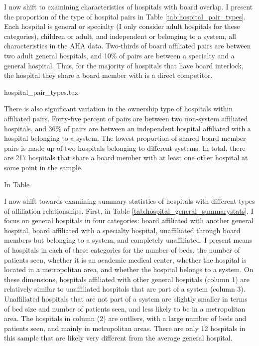 \documentclass[12pt]{article}
\begin{document}
    I now shift to examining characteristics of hospitals with board overlap. I present the proportion of the type of hospital pairs in Table \ref{tab:hospital_pair_types}. Each hospital is general or specialty (I only consider adult hospitals for these categories), children or adult, and independent or belonging to a system, all characteristics in the AHA data. Two-thirds of board affiliated pairs are between two adult general hospitals, and 10\% of pairs are between a specialty and a general hospital. Thus, for the majority of hospitals that have board interlock, the hospital they share a board member with is a direct competitor. 

    {hospital_pair_types.tex}
    
    There is also significant variation in the ownership type of hospitals within affiliated pairs. Forty-five percent of pairs are between two non-system affiliated hospitals, and 36\% of pairs are between an independent hospital affiliated with a hospital belonging to a system. The lowest proportion of shared board member pairs is made up of two hospitals belonging to different systems. In total, there are 217 hospitals that share a board member with at least one other hospital at some point in the sample. 

    In Table 


    I now shift towards examining summary statistics of hospitals with different types of affiliation relationships. First, in Table \ref{tab:hospital_general_summarystats}, I focus on general hospitals in four categories: board affiliated with another general hospital, board affiliated with a specialty hospital, unaffiliated through board members but belonging to a system, and completely unaffiliated. I present means of hospitals in each of these categories for the number of beds, the number of patients seen, whether it is an academic medical center, whether the hospital is located in a metropolitan area, and whether the hospital belongs to a system. On these dimensions, hospitals affiliated with other general hospitals (column 1) are relatively similar to unaffiliated hospitals that are part of a system (column 3). Unaffiliated hospitals that are not part of a system are slightly smaller in terms of bed size and number of patients seen, and less likely to be in a metropolitan area. The hospitals in column (2) are outliers, with a large number of beds and patients seen, and mainly in metropolitan areas. There are only 12 hospitals in this sample that are likely very different from the average general hospital. 
\end{document}
